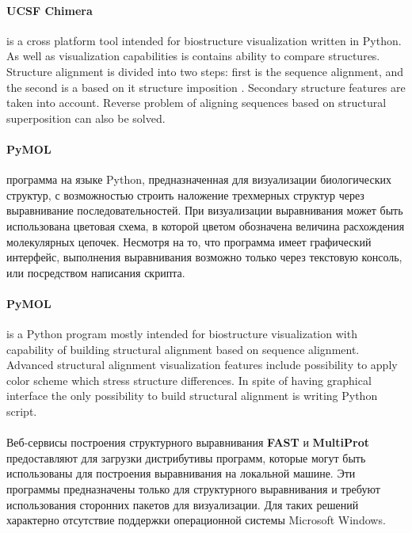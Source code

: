 \documentclass[a4paper, 12pt, titlepage, utf8]{extarticle}
\begin{document}
\begin{original}
\begin{original}
\paragraph{UCSF Chimera \cite{chimera}}
is a cross platform tool intended for biostructure visualization written in Python.
As well as visualization capabilities is contains ability to compare structures.
Structure alignment is divided into two steps: first is the sequence alignment,
and the second is a based on it structure imposition \cite{chimera-alignment}.
Secondary structure features are taken into account. Reverse problem of aligning
sequences based on structural superposition can also be solved.

\begin{original}
\paragraph{PyMOL \cite{pymol}}
программа на языке Python, предназначенная для визуализации биологических
структур, с возможностью строить наложение трехмерных структур через
выравнивание последовательностей. При визуализации выравнивания может быть
использована цветовая схема, в которой цветом обозначена величина расхождения
молекулярных цепочек. Несмотря на то, что программа имеет графический интерфейс,
выполнения выравнивания возможно только через текстовую консоль, или посредством
написания скрипта.
\end{original}

\paragraph{PyMOL \cite{pymol}}
is a Python program mostly intended for biostructure visualization with capability of
building structural alignment based on sequence alignment. Advanced structural alignment
visualization features include possibility to apply color scheme which stress structure
differences. In spite of having graphical interface the only possibility to build
structural alignment is writing Python script.

\begin{original}
\paragraph{}
Веб-сервисы построения структурного выравнивания \textbf{FAST} и
\textbf{MultiProt} предоставляют для загрузки дистрибутивы программ, которые
могут быть использованы для построения выравнивания на локальной машине. Эти
программы предназначены только для структурного выравнивания и требуют
использования сторонних пакетов для визуализации. Для таких решений характерно
отсутствие поддержки операционной системы Microsoft Windows.
\end{original}


\end{original}
\end{original}
\end{document}

